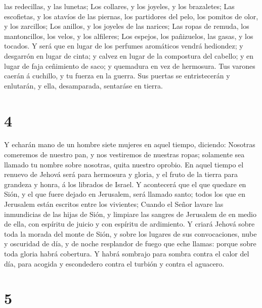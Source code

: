 las redecillas, y las lunetas;  Los collares, y los
joyeles, y los brazaletes;  Las escofietas, y los atavíos
de las piernas, los partidores del pelo, los pomitos de olor, y los
zarcillos;  Los anillos, y los joyeles de las narices;
 Las ropas de remuda, los mantoncillos, los velos, y los
alfileres;  Los espejos, los pañizuelos, las gasas, y los
tocados.  Y será que en lugar de los perfumes aromáticos
vendrá hediondez; y desgarrón en lugar de cinta; y calvez en lugar de la
compostura del cabello; y en lugar de faja ceñimiento de saco; y
quemadura en vez de hermosura.  Tus varones caerán á
cuchillo, y tu fuerza en la guerra.  Sus puertas se
entristecerán y enlutarán, y ella, desamparada, sentaráse en tierra.

\hypertarget{section-3}{%
\section{4}\label{section-3}}

 Y echarán mano de un hombre siete mujeres en aquel tiempo,
diciendo: Nosotras comeremos de nuestro pan, y nos vestiremos de
nuestras ropas; solamente sea llamado tu nombre sobre nosotras, quita
nuestro oprobio.  En aquel tiempo el renuevo de Jehová será
para hermosura y gloria, y el fruto de la tierra para grandeza y honra,
á los librados de Israel.  Y acontecerá que el que quedare
en Sión, y el que fuere dejado en Jerusalem, será llamado santo; todos
los que en Jerusalem están escritos entre los vivientes; 
Cuando el Señor lavare las inmundicias de las hijas de Sión, y limpiare
las sangres de Jerusalem de en medio de ella, con espíritu de juicio y
con espíritu de ardimiento.  Y criará Jehová sobre toda la
morada del monte de Sión, y sobre los lugares de sus convocaciones, nube
y oscuridad de día, y de noche resplandor de fuego que eche llamas:
porque sobre toda gloria habrá cobertura.  Y habrá sombrajo
para sombra contra el calor del día, para acogida y escondedero contra
el turbión y contra el aguacero.

\hypertarget{section-4}{%
\section{5}\label{section-4}}

